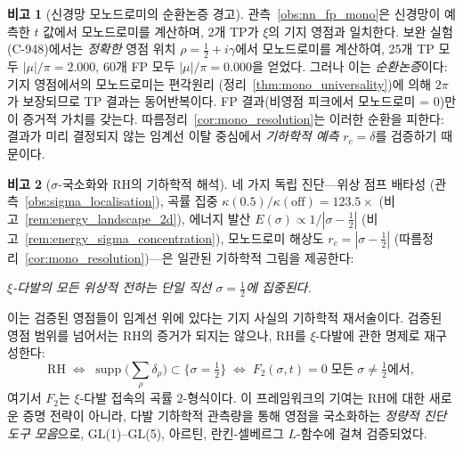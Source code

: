 \documentclass[11pt, a4paper]{article}
\theoremstyle{definition}
\newtheorem{remark}{비고}[section]
\theoremstyle{plain}
\newcommand{\xif}{\xi}
\begin{document}
\begin{remark}[신경망 모노드로미의 순환논증 경고]
\label{rem:circular_argument_caveat}
관측~\ref{obs:nn_fp_mono}은 신경망이 예측한 $t$ 값에서
모노드로미를 계산하며, 2개 TP가 $\xif$의 기지 영점과 일치한다.
보완 실험(C-948)에서는 \emph{정확한} 영점 위치
$\rho = \tfrac{1}{2} + i\gamma$에서 모노드로미를 계산하여,
25개 TP 모두 $|\mu|/\pi = 2.000$,
60개 FP 모두 $|\mu|/\pi = 0.000$을 얻었다.
그러나 이는 \emph{순환논증}이다:
기지 영점에서의 모노드로미는 편각원리
(정리~\ref{thm:mono_universality})에 의해 $2\pi$가 보장되므로
TP 결과는 동어반복이다.
FP 결과(비영점 피크에서 모노드로미 = 0)만이
증거적 가치를 갖는다.
따름정리~\ref{cor:mono_resolution}는 이러한 순환을 피한다:
결과가 미리 결정되지 않는 임계선 이탈 중심에서
\emph{기하학적 예측} $r_c = \delta$를 검증하기 때문이다.
\end{remark}

\begin{remark}[$\sigma$-국소화와 RH의 기하학적 해석]
\label{rem:sigma_localisation_geometry}
네 가지 독립 진단---위상 점프 배타성
(관측~\ref{obs:sigma_localisation}),
곡률 집중 $\kappa(0.5)/\kappa(\mathrm{off}) = 123.5\times$
(비고~\ref{rem:energy_landscape_2d}),
에너지 발산 $E(\sigma) \propto 1/|\sigma - \tfrac{1}{2}|$
(비고~\ref{rem:energy_sigma_concentration}),
모노드로미 해상도 $r_c = |\sigma - \tfrac{1}{2}|$
(따름정리~\ref{cor:mono_resolution})---은
일관된 기하학적 그림을 제공한다:

\smallskip\noindent
\emph{$\xi$-다발의 모든 위상적 전하는
단일 직선 $\sigma = \tfrac{1}{2}$에 집중된다.}

\smallskip\noindent
이는 검증된 영점들이 임계선 위에 있다는 기지 사실의
기하학적 재서술이다.
검증된 영점 범위를 넘어서는 RH의 증거가 되지는 않으나,
RH를 $\xi$-다발에 관한 명제로 재구성한다:
\[
  \text{RH} \;\Longleftrightarrow\;
  \operatorname{supp}\bigl(\textstyle\sum_\rho \delta_\rho\bigr)
  \subset \{\sigma = \tfrac{1}{2}\}
  \;\Longleftrightarrow\;
  F_2(\sigma, t) = 0 \;\text{모든}\;
  \sigma \neq \tfrac{1}{2}\text{에서},
\]
여기서 $F_2$는 $\xi$-다발 접속의 곡률 $2$-형식이다.
이 프레임워크의 기여는 RH에 대한 새로운 증명 전략이 아니라,
다발 기하학적 관측량을 통해 영점을 국소화하는
\emph{정량적 진단 도구 모음}으로,
GL(1)--GL(5), 아르틴, 란킨-셀베르그 $L$-함수에 걸쳐
검증되었다.
\end{remark}
\end{document}
